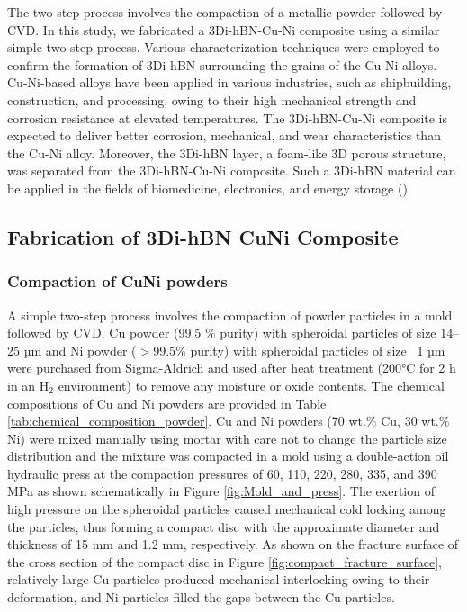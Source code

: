 The two-step process involves the compaction of a metallic powder followed by CVD. In this study, we fabricated a 3Di-hBN-Cu-Ni composite using a similar simple two-step process. Various characterization techniques were employed to confirm the formation of 3Di-hBN surrounding the grains of the Cu-Ni alloys. Cu-Ni-based alloys have been applied in various industries, such as shipbuilding, construction, and processing, owing to their high mechanical strength and corrosion resistance at elevated temperatures. The 3Di-hBN-Cu-Ni composite is expected to deliver better corrosion, mechanical, and wear characteristics than the Cu-Ni alloy. Moreover, the 3Di-hBN layer, a foam-like 3D porous structure, was separated from the 3Di-hBN-Cu-Ni composite. Such a 3Di-hBN material can be applied in the fields of biomedicine, electronics, and energy storage (\cite{gautam2018synthesis, guiney2018three, yin2013ultralight}).

\subsection{Fabrication of 3Di-hBN CuNi Composite}

\subsubsection{Compaction of CuNi powders}
A simple two-step process involves the compaction of powder particles in a mold followed by CVD. Cu powder (99.5 \% purity) with spheroidal particles of size 14–25 µm and Ni powder ($>$99.5\% purity) with spheroidal particles of size ~1 µm were purchased from Sigma-Aldrich and used after heat treatment (200°C for 2 h in an $\text{H}_{2}$ environment) to remove any moisture or oxide contents. The chemical compositions of Cu and Ni powders are provided in Table \ref{tab:chemical_composition_powder}. Cu and Ni powders (70 wt.\% Cu, 30 wt.\% Ni) were mixed manually using mortar with care not to change the particle size distribution and the mixture was compacted in a mold using a double-action oil hydraulic press at the compaction pressures of 60, 110, 220, 280, 335, and 390 MPa as shown schematically in Figure \ref{fig:Mold_and_press}. The exertion of high pressure on the spheroidal particles caused mechanical cold locking among the particles, thus forming a compact disc with the approximate diameter and thickness of 15 mm and 1.2 mm, respectively. As shown on the fracture surface of the cross section of the compact disc in Figure \ref{fig:compact_fracture_surface}, relatively large Cu particles produced mechanical interlocking owing to their deformation, and Ni particles filled the gaps between the Cu particles.

